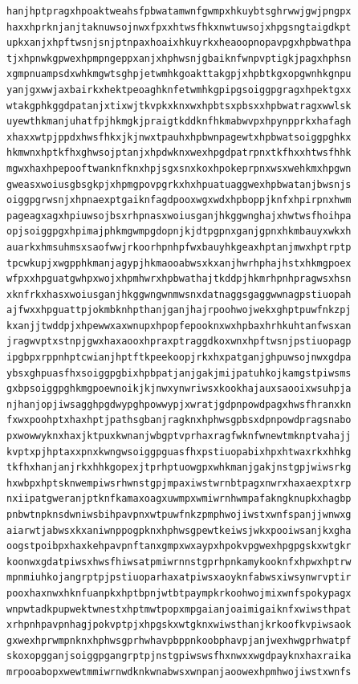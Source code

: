 \documentclass[11pt,letterpaper]{exam}
\begin{document}
\begin{questions}
\begin{verbatim}
hanjhptpragxhpoaktweahsfpbwatamwnfgwmpxhkuybtsghrwwjgwjpngpx
haxxhprknjanjtaknuwsojnwxfpxxhtwsfhkxnwtuwsojxhpgsngtaigdkpt
upkxanjxhpftwsnjsnjptnpaxhoaixhkuyrkxheaoopnopavpgxhpbwathpa
tjxhpnwkgpwexhpmpngeppxanjxhphwsnjgbaiknfwnpvptigkjpagxhphsn
xgmpnuampsdxwhkmgwtsghpjetwmhkgoakttakgpjxhpbtkgxopgwnhkgnpu
yanjgxwwjaxbairkxhektpeoaghknfetwmhkgpipgsoiggpgragxhpektgxx
wtakgphkggdpatanjxtixwjtkvpkxknxwxhpbtsxpbsxxhpbwatragxwwlsk
uyewthkmanjuhatfpjhkmgkjpraigtkddknfhkmabwvpxhpynpprkxhafagh
xhaxxwtpjppdxhwsfhkxjkjnwxtpauhxhpbwnpagewtxhpbwatsoiggpghkx
hkmwnxhptkfhxghwsojptanjxhpdwknxwexhpgdpatrpnxtkfhxxhtwsfhhk
mgwxhaxhpepooftwanknfknxhpjsgxsnxkoxhpokeprpnxwsxwehkmxhpgwn
gweasxwoiusgbsgkpjxhpmgpovpgrkxhxhpuatuaggwexhpbwatanjbwsnjs
oiggpgrwsnjxhpnaexptgaiknfagdpooxwgxwdxhpboppjknfxhpirpnxhwm
pageagxagxhpiuwsojbsxrhpnasxwoiusganjhkggwnghajxhwtwsfhoihpa
opjsoiggpgxhpimajphkmgwmpgdopnjkjdtpgpnxganjgpnxhkmbauyxwkxh
auarkxhmsuhmsxsaofwwjrkoorhpnhpfwxbauyhkgeaxhptanjmwxhptrptp
tpcwkupjxwgpphkmanjagypjhkmaooabwsxkxanjhwrhphajhstxhkmgpoex
wfpxxhpguatgwhpxwojxhpmhwrxhpbwathajtkddpjhkmrhpnhpragwsxhsn
xknfrkxhasxwoiusganjhkggwngwnmwsnxdatnaggsgaggwwnagpstiuopah
ajfwxxhpguattpjokmbknhpthanjganjhajrpoohwojwekxghptpuwfnkzpj
kxanjjtwddpjxhpewwxaxwnupxhpopfepooknxwxhpbaxhrhkuhtanfwsxan
jragwvptxstnpjgwxhaxaooxhpraxptraggdkoxwnxhpftwsnjpstiuopagp
ipgbpxrppnhptcwianjhptftkpeekoopjrkxhxpatganjghpuwsojnwxgdpa
ybsxghpuasfhxsoiggpgbixhpbpatjanjgakjmijpatuhkojkamgstpiwsms
gxbpsoiggpghkmgpoewnoikjkjnwxynwriwsxkookhajauxsaooixwsuhpja
njhanjopjiwsagghpgdwypghpowwypjxwratjgdpnpowdpagxhwsfhranxkn
fxwxpoohptxhaxhptjpathsgbanjragknxhphwsgpbsxdpnpowdpragsnabo
pxwowwyknxhaxjktpuxkwnanjwbgptvprhaxragfwknfwnewtmknptvahajj
kvptxpjhptaxxpnxkwngwsoiggpguasfhxpstiuopabixhpxhtwaxrkxhhkg
tkfhxhanjanjrkxhhkgopexjtprhptuowgpxwhkmanjgakjnstgpjwiwsrkg
hxwbpxhptsknwempiwsrhwnstgpjmpaxiwstwrnbtpagxnwrxhaxaexptxrp
nxiipatgweranjptknfkamaxoagxuwmpxwmiwrnhwmpafakngknupkxhagbp
pnbwtnpknsdwniwsbihpavpnxwtpuwfnkzpmphwojiwstxwnfspanjjwnwxg
aiarwtjabwsxkxaniwnppogpknxhphwsgpewtkeiwsjwkxpooiwsanjkxgha
oogstpoibpxhaxkehpavpnftanxgmpxwxaypxhpokvpgwexhpgpgskxwtgkr
koonwxgdatpiwsxhwsfhiwsatpmiwrnnstgprhpnkamykooknfxhpwxhptrw
mpnmiuhkojangrptpjpstiuoparhaxatpiwsxaoyknfabwsxiwsynwrvptir
pooxhaxnwxhknfuanpkxhptbpnjwtbtpaympkrkoohwojmixwnfspokypagx
wnpwtadkpupwektwnestxhptmwtpopxmpgaianjoaimigaiknfxwiwsthpat
xrhpnhpavpnhagjpokvptpjxhpgskxwtgknxwiwsthanjkrkoofkvpiwsaok
gxwexhprwmpnknxhphwsgprhwhavpbppnkoobphavpjanjwexhwgprhwatpf
skoxopgganjsoiggpgangrptpjnstgpiwswsfhxnwxxwgdpayknxhaxraika
mrpooabopxwewtmmiwrnwdknkwnabwsxwnpanjaoowexhpmhwojiwstxwnfs

\end{verbatim}
\end{questions}
\end{document}
